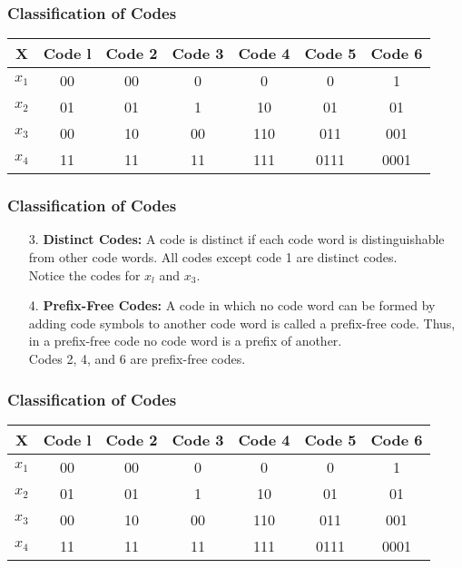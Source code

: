 \documentclass{beamer}
\begin{document}
\begin{frame}
\frametitle{Classification of Codes}

\large
\begin{center}
\begin{tabular}{|c| c| c| c| c| c| c|}
\hline
X& Code l& Code 2& Code 3 &Code 4& Code 5& Code 6\\\hline
$x_1$& 00& 00 &0 &0 &0 &1\\
$x_2$& 01& 01 &1 &10 &01 &01\\
$x_3$ &00 &10& 00& 110& 011 &001\\
$x_4$ &11& 11& 11& 111 &0111 &0001\\\hline
\end{tabular}
\end{center}
\end{frame}


\begin{frame}

\frametitle{Classification of Codes}
\Large
\begin{itemize}
\item[3.] \textbf{Distinct Codes:}
A code is distinct if each code word is distinguishable from other code words. All codes except code 1 are distinct codes.\\ Notice the codes for $x_l$ and $x_3$.
\item[4.] \textbf{Prefix-Free Codes:}
A code in which no code word can be formed by adding code symbols to another code word is
called a prefix-free code. Thus, in a prefix-free code no code word is a prefix of another. \\ Codes 2, 4,
and 6 are prefix-free codes.
\end{itemize}
\end{frame}

\begin{frame}
\frametitle{Classification of Codes}

\large
\begin{center}
\begin{tabular}{|c| c| c| c| c| c| c|}
\hline
X& Code l& Code 2& Code 3 &Code 4& Code 5& Code 6\\\hline
$x_1$& 00& 00 &0 &0 &0 &1\\
$x_2$& 01& 01 &1 &10 &01 &01\\
$x_3$ &00 &10& 00& 110& 011 &001\\
$x_4$ &11& 11& 11& 111 &0111 &0001\\\hline
\end{tabular}
\end{center}
\end{frame}
\end{document}
